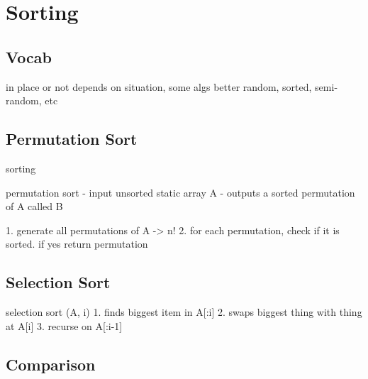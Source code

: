 \documentclass{article}
\begin{document}

\section{Sorting}
\subsection{Vocab}
in place or not
depends on situation, some algs better random, sorted, semi-random, etc
\subsection{Permutation Sort}
sorting

permutation sort
- input unsorted static array A
- outputs a sorted permutation of A called B


1. generate all permutations of A -> n!
2. for each permutation, check if it is sorted. if yes return permutation

\subsection{Selection Sort}
selection sort (A, i)
1. finds biggest item in A[:i]
2. swaps biggest thing with thing at A[i]
3. recurse on A[:i-1]

\subsection{Comparison}
\end{document}
